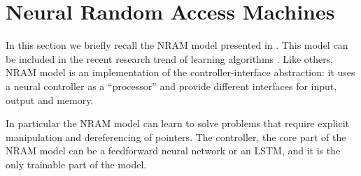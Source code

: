 \section{Neural Random Access Machines} \label{nram}
In this section we briefly recall the NRAM model presented in \cite{NRAM:2016}.  
This model can be included in the recent research trend of learning algorithms \cite{Graves2014NeuralTM,greve2016evolving,Joulin2015InferringAP,zaremba:2016,zaremba:2015}.
Like others, NRAM model is an implementation of the controller-interface abstraction: it uses a neural controller as a ``processor'' and provide different interfaces for input, output and memory. 

In particular the NRAM model can learn to solve problems that require explicit manipulation and dereferencing of pointers. 
 The controller, the core part of the NRAM model can be a feedforward neural network or an LSTM, and it is the only
trainable part of the model.

